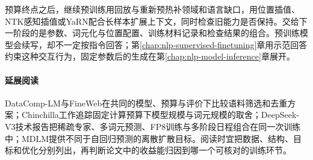 预算终点之后，继续预训练用回放与重新预热补领域和语言缺口，用位置插值、NTK感知插值或YaRN配合长样本扩展上下文，同时检查旧能力是否保持。交给下一阶段的是参数、词元化与位置配置、训练材料记录和检查结果的组合。预训练模型会续写，却不一定按指令回答；第\ref{chap:nlp-supervised-finetuning}章用示范回答约束这种交互行为，固定参数后的生成在第\ref{chap:nlp-model-inference}章展开。

\paragraph{延展阅读}
DataComp-LM与FineWeb在共同的模型、预算与评价下比较语料筛选和去重方案；Chinchilla工作追踪固定计算预算下模型规模与词元规模的取舍；DeepSeek-V3技术报告把稀疏专家、多词元预测、FP8训练与多阶段日程组合在同一次训练中；MDLM提供不同于自回归预测的离散扩散目标。阅读时宜把数据、结构、目标和优化分别列出，再判断论文中的收益能归因到哪一个可核对的训练环节。
